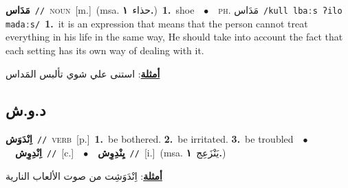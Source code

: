 \documentclass[10pt,a4paper,twoside]{article} %
\begin{document}
\begin{multicols}{2}
{\setlength\topsep{0pt}\textbf{\foreignlanguage{arabic}{مَدَاس}}\ {\color{gray}\texttt{//}\color{black}}\ \textsc{noun}\ [m.]\ \color{gray}(msa. \foreignlanguage{arabic}{حذاء}~\foreignlanguage{arabic}{\textbf{١.}})\color{black}\ \textbf{1.}~shoe\ \ $\bullet$\ \ \textsc{ph.} \color{gray} \foreignlanguage{arabic}{مَدَاس}\color{black}\ {\color{gray}\texttt{/{\sffamily kull lbaːs ʔilo madaːs}/}\color{black}}\ \textbf{1.}~it is an expression that means that the person cannot treat everything in his life in the same way, He should take into account the fact that each setting has its own way of dealing with it.\  \begin{flushright}\color{gray}\foreignlanguage{arabic}{\textbf{\underline{\foreignlanguage{arabic}{أمثلة}}}: استنى علي شوي تألبس المَداس}\end{flushright}\color{black}} \vspace{2mm}

\vspace{-3mm}
\subsection*{\color{blue}\foreignlanguage{arabic}{د.و.ش}\color{blue}{}} 

{\setlength\topsep{0pt}\textbf{\foreignlanguage{arabic}{اِنْدَوَش}}\ {\color{gray}\texttt{//}\color{black}}\ \textsc{verb}\ [p.]\ \textbf{1.}~be bothered.  \textbf{2.}~be irritated.  \textbf{3.}~be troubled\ \ $\bullet$\ \ \setlength\topsep{0pt}\textbf{\foreignlanguage{arabic}{اِنْدِوِش}}\ {\color{gray}\texttt{//}\color{black}}\ [c.]\ \ $\bullet$\ \ \setlength\topsep{0pt}\textbf{\foreignlanguage{arabic}{يِنْدِوِش}}\ {\color{gray}\texttt{//}\color{black}}\ [i.]\ \color{gray}(msa. \foreignlanguage{arabic}{يَنْزَعِج}~\foreignlanguage{arabic}{\textbf{١.}})\color{black}\  \begin{flushright}\color{gray}\foreignlanguage{arabic}{\textbf{\underline{\foreignlanguage{arabic}{أمثلة}}}: اِنْدَوَشِت من صوت الألعاب النارية}\end{flushright}\color{black}} \vspace{2mm}


\end{multicols}
\end{document}
